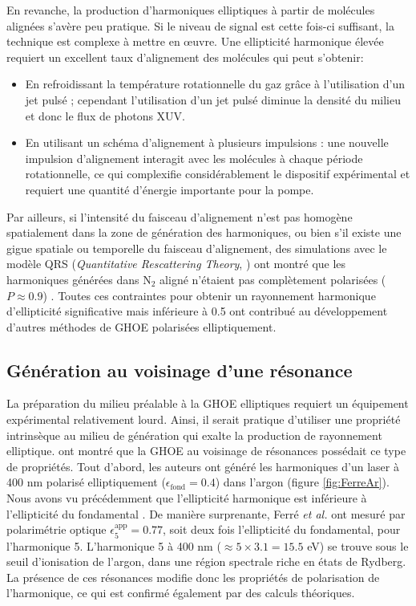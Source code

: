 En revanche, la production d'harmoniques elliptiques à partir de molécules alignées s'avère peu pratique. Si le niveau de signal est cette fois-ci suffisant, la technique est complexe à mettre en \oe uvre. Une ellipticité harmonique élevée requiert un excellent taux d'alignement des molécules qui peut s'obtenir:
\begin{itemize}
\item En refroidissant la température rotationnelle du gaz grâce à l'utilisation d'un jet pulsé ; cependant l'utilisation d'un jet pulsé diminue la densité du milieu et donc le flux de photons XUV.
\item En utilisant un schéma d'alignement à plusieurs impulsions : une nouvelle impulsion d'alignement interagit avec les molécules à chaque période rotationnelle, ce qui complexifie considérablement le dispositif expérimental et requiert une quantité d'énergie importante pour la pompe.
\end{itemize}
Par ailleurs, si l'intensité du faisceau d'alignement n'est pas homogène spatialement dans la zone de génération des harmoniques, ou bien s'il existe une gigue spatiale ou temporelle du faisceau d'alignement, des simulations avec le modèle QRS (\textit{Quantitative Rescattering Theory}, ) ont montré que les harmoniques générées dans N$_2$ aligné n'étaient pas complètement polarisées ($P \approx 0.9$) . Toutes ces contraintes pour obtenir un rayonnement harmonique d'ellipticité significative mais inférieure à 0.5 ont contribué au développement d'autres méthodes de GHOE polarisées elliptiquement.

\subsection{Génération au voisinage d'une résonance}
La préparation du milieu préalable à la GHOE elliptiques requiert un équipement expérimental relativement lourd. Ainsi, il serait pratique d'utiliser une propriété intrinsèque au milieu de génération qui exalte la production de rayonnement elliptique.  ont montré que la GHOE au voisinage de résonances possédait ce type de propriétés. Tout d'abord, les auteurs ont généré les harmoniques d'un laser à 400 nm polarisé elliptiquement ($\epsilon_{\text{fond}} = 0.4$) dans l'argon (figure \ref{fig:FerreAr}). Nous avons vu précédemment que l'ellipticité harmonique est inférieure à l'ellipticité du fondamental . De manière surprenante, Ferré \textit{et al.} ont mesuré par polarimétrie optique $\epsilon_5^{\text{app}} = 0.77$, soit deux fois l'ellipticité du fondamental, pour l'harmonique 5. L'harmonique 5 à 400 nm ($\approx 5 \times 3.1 = 15.5$ eV) se trouve sous le seuil d'ionisation de l'argon, dans une région spectrale riche en états de Rydberg. La présence de ces résonances modifie donc les propriétés de polarisation de l'harmonique, ce qui est confirmé également par des calculs théoriques.

